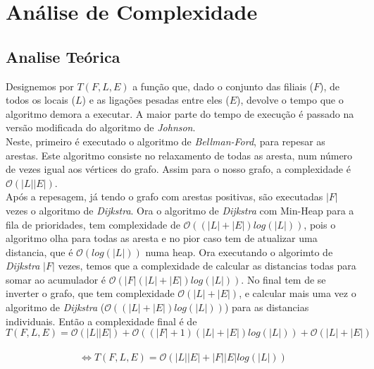 \documentclass[12pt]{article}
\begin{document}
\section{Análise de Complexidade}
\subsection{Analise Teórica}
Designemos por $T(F, L ,E)$ a função que, dado o conjunto das filiais ($F$), de todos os locais ($L$) e as ligações pesadas entre eles ($E$), devolve o tempo que o algoritmo demora a executar.
A maior parte do tempo de execução é passado na versão modificada do algoritmo de \textit{Johnson}. \\
\indent Neste, primeiro é executado o algoritmo de \textit{Bellman-Ford}\cite{bellman1956routing}, para repesar as arestas. Este algoritmo consiste no relaxamento de todas as aresta, num número de vezes igual aos vértices do grafo. Assim para o nosso grafo, a complexidade é $\mathcal{O}(|L||E|)$. \\
\indent Após a repesagem, já tendo o grafo com arestas positivas, são executadas $|F|$ vezes o algoritmo de \textit{Dijkstra}. Ora o algoritmo de \textit{Dijkstra} com Min-Heap para a fila de prioridades, tem complexidade de $\mathcal{O}((|L|+|E|)log(|L|))$, pois o algoritmo olha para todas as aresta e no pior caso tem de atualizar uma distancia, que é $\mathcal{O}(log(|L|))$ numa heap. Ora executando o algorimto de \textit{Dijkstra} $|F|$ vezes, temos que a complexidade de calcular as distancias todas para somar ao acumulador é $\mathcal{O}(|F|(|L|+|E|)log(|L|))$. No final tem de se inverter o grafo, que tem complexidade $\mathcal{O}(|L|+|E|)$, e calcular mais uma vez o algoritmo de \textit{Dijkstra} ($\mathcal{O}((|L|+|E|)log(|L|))$) para as distancias individuais. Então a complexidade final é de \[ T(F, L ,E) = \mathcal{O}(|L||E|) + \mathcal{O}((|F|+1)(|L|+|E|)log(|L|)) + \mathcal{O}(|L|+|E|)\] \\
\[ \Leftrightarrow  T(F, L ,E) = \mathcal{O}(|L||E| + |F||E|log(|L|))\]
\end{document}
